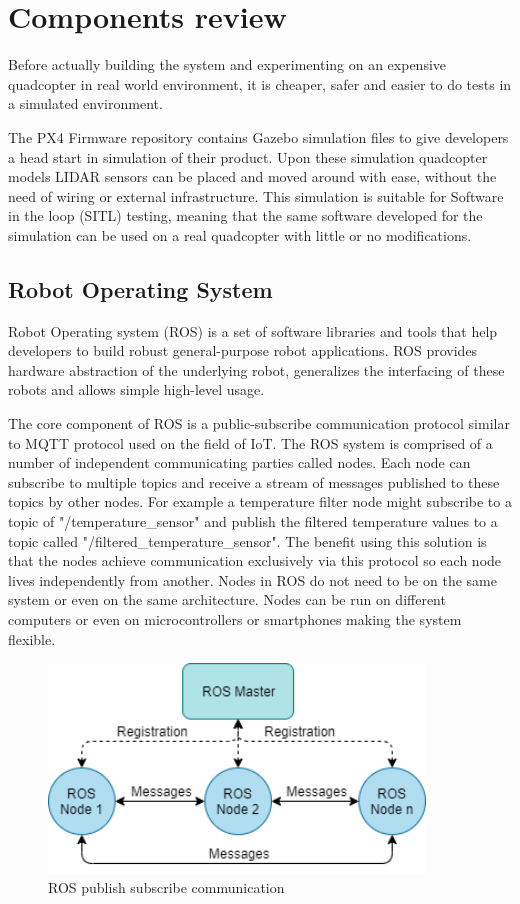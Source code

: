\chapter{Components review} \label{chap:simulation}
Before actually building the system and experimenting on an expensive quadcopter in real world environment,
it is cheaper, safer and easier to do tests in a simulated environment. 

The PX4 Firmware repository\cite{PX4Repository} contains Gazebo simulation files to give developers a head 
start in simulation of their product. Upon these simulation quadcopter models LIDAR sensors can be placed and 
moved around with ease, without the need of wiring or external infrastructure. This simulation is 
suitable for Software in the loop (SITL) testing, meaning that the same software developed for the simulation
can be used on a real quadcopter with little or no modifications.



\section{Robot Operating System}
Robot Operating system (ROS) is a set of software libraries and tools that help developers to build robust 
general-purpose robot applications\cite{ROSWebsite}. ROS provides hardware abstraction of the underlying 
robot, generalizes the interfacing of these robots and allows simple high-level usage.


The core component of ROS is a public-subscribe communication protocol similar to MQTT protocol
used on the field of IoT. The ROS system is comprised of a number of independent communicating parties called 
nodes. Each node can subscribe to multiple topics and receive a stream of messages published to these topics 
by other nodes. For example a temperature filter node might subscribe to a topic of "/temperature\_sensor" 
and publish the filtered temperature values to a topic called "/filtered\_temperature\_sensor". 
The benefit using this solution is that the nodes achieve communication exclusively via this protocol 
so each node lives independently from another. Nodes in ROS do not need to be on the same system or 
even on the same architecture. Nodes can be run on different computers or even on microcontrollers or 
smartphones making the system flexible.

\begin{figure}[!ht]
    \centering
    \includegraphics[width=100mm, keepaspectratio]{figures/ros_pubsub.png}
    \caption{ROS publish subscribe communication}
    \label{fig:ros_pubsub}
\end{figure}

